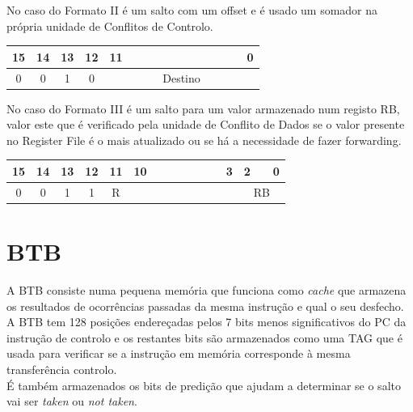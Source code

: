 No caso do Formato II é um salto com um offset e é usado um somador na própria unidade de Conflitos de Controlo.
\begin{table}[H]
	\centering
	\begin{tabular}{cccccccccccccccc}
		15 & 14 & 13 & 12 & 11 &  &  &  &  &  &  &  &  &  &  & 0 \\ \hline
		\multicolumn{1}{|c}{0} & \multicolumn{1}{c|}{0} & 1 & \multicolumn{1}{c|}{0} & \multicolumn{12}{c|}{Destino} \\ \hline
	\end{tabular}
\end{table}
No caso do Formato III é um salto para um valor armazenado num registo RB, valor este que é verificado pela unidade de Conflito de Dados se o valor presente no Register File é o mais atualizado ou se há a necessidade de fazer forwarding.
\begin{table}[H]
	\centering
	\begin{tabular}{cccccccccccccccc}
		15 & 14 & 13 & 12 & 11 & 10 &  &  &  &  &  &  & 3 & 2 &  & 0 \\ \hline
		\multicolumn{1}{|c}{0} & \multicolumn{1}{c|}{0} & 1 & \multicolumn{1}{c|}{1} & \multicolumn{1}{c|}{R} & \multicolumn{8}{c|}{} & \multicolumn{3}{c|}{RB} \\ \hline
	\end{tabular}
\end{table}

\section{BTB}
A BTB consiste numa pequena memória que funciona como \textit{cache} que armazena os resultados de ocorrências passadas da mesma instrução e qual o seu desfecho.
A BTB tem 128 posições endereçadas pelos 7 bits menos significativos do PC da instrução de controlo e os restantes bits são armazenados como uma TAG que é usada para verificar se a instrução em memória corresponde à mesma transferência controlo.\\

É também armazenados os bits de predição que ajudam a determinar se o salto vai ser \textit{taken} ou \textit{not taken}.

